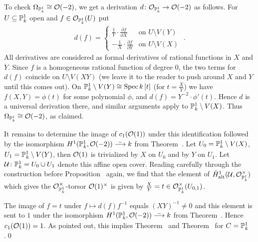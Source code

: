 \documentclass[a4paper,parskip=half,numbers=enddot, DIV=12]{scrreprt}
\begin{document}
To check $\Omega_{\mathbb{P}_k^1}\cong\mathcal{O}(-2)$, we get a derivation $d\colon \Oo_{\IP_k^1}\morphism\Oo(-2)$ as follows. For $U\subseteq \mathbb{P}_k^1$ open and $f\in\mathcal{O}_{\mathbb{P}_k^1}(U)$ put
\begin{align*}
d(f)=\begin{cases}
\frac{1}{Y}\cdot\frac{\partial f}{\partial X} & \text{on }U\setminus V(Y)\\
-\frac{1}{X}\cdot\frac{\partial f}{\partial Y} & \text{on }U\setminus V(X)
\end{cases}\;.
\end{align*}
All derivatives are considered as formal derivatives of rational functions in $X$ and $Y$. Since $f$ is a homogeneous rational function of degree $0$, the two terms for $d(f)$ coincide on $U\setminus V(XY)$ (we leave it to the reader to push around $X$ and $Y$ until this comes out). On $\mathbb{P}_k^1\setminus V(Y)\cong \operatorname{Spec} k\left[t\right]$ (for $t=\frac{X}{Y}$) we have $f(X,Y)=\phi\left(t\right)$ for some polynomial $\phi$, and $d(f)=Y^{-2}\cdot \phi'\left(t\right)$. Hence $d$ is a universal derivation there, and similar arguments apply to $\mathbb{P}_k^1\setminus V(X)$. Thus $\Omega_{\mathbb{P}_k^1}\cong \mathcal{O}(-2)$, as claimed.

It remains to determine the image of $c_1(\mathcal{O}(1))$ under this identification followed by the isomorphism $H^1(\IP_k^1,\Oo(-2))\isomorphism k$ from Theorem~. Let $U_0=\mathbb{P}_k^1\setminus V(X)$, $U_1=\mathbb{P}_k^1\setminus V(Y)$, then $\mathcal{O}(1)$ is trivialized by $X$ on $U_0$ and by $Y$ on $U_1$. Let $\mathcal{U}\colon \mathbb{P}_k^1=U_0\cup U_1$ denote this affine open cover. Reading carefully through the construction before Proposition~ again, we find that the element of $\check{H}_{\mathrm{alt}}^1(\mathcal{U},\mathcal{O}_{\mathbb{P}_k^1}^\times)$ which gives the $\mathcal{O}_{\mathbb{P}_k^1}^\times$-torsor $\mathcal{O}(1)^\times$ is given by $\frac{X}{Y}=t\in\mathcal{O}_{\mathbb{P}_k^1}^\times(U_{0,1})$.

The image of $f=t$ under $f\mapsto d(f)f^{-1}$ equals $(XY)^{-1}\neq 0$ and this element is sent to $1$ under the isomorphism $H^1(\IP_k^1,\Oo(-2))\isomorphism k$ from Theorem~. Hence $c_1(\mathcal{O}(1))=1$. As pointed out, this implies Theorem~ and Theorem~ for $C=\mathbb{P}_k^1$.\qed
\end{document}

